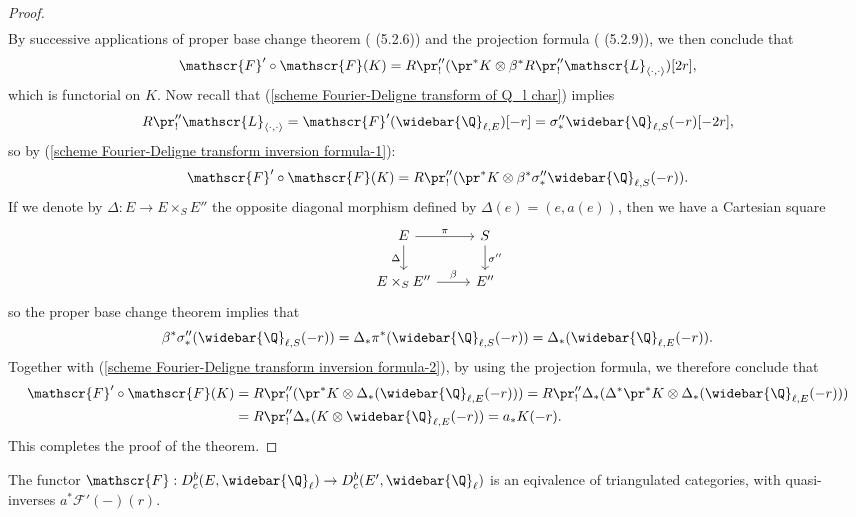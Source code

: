 \begin{proof}
\begin{align*}
\end{align*}
By successive applications of proper base change theorem (\cite{SGA4}  (5.2.6)) and the projection formula (\cite{SGA4}  (5.2.9)), we then conclude that
\begin{equation}\label{scheme Fourier-Deligne transform inversion formula-1}
\mathscr{F}'\circ\mathscr{F}(K)=R\pr''_!(\pr^*K\otimes\beta^*R\pr''_!\mathscr{L}_{\langle\cdot,\cdot\rangle})[2r],
\end{equation}
which is functorial on $K$. Now recall that (\ref{scheme Fourier-Deligne transform of Q_l char}) implies
\[R\pr''_!\mathscr{L}_{\langle\cdot,\cdot\rangle}=\mathscr{F}'(\widebar{\Q}_{\ell,E})[-r]=\sigma''_*\widebar{\Q}_{\ell,S}(-r)[-2r],\]
so by (\ref{scheme Fourier-Deligne transform inversion formula-1}):
\begin{equation}\label{scheme Fourier-Deligne transform inversion formula-2}
\mathscr{F}'\circ\mathscr{F}(K)=R\pr''_!(\pr^*K\otimes\beta^*\sigma''_*\widebar{\Q}_{\ell,S}(-r)).
\end{equation}
If we denote by $\Delta:E\to E\times_SE''$ the opposite diagonal morphism defined by $\Delta(e)=(e,a(e))$, then we have a Cartesian square
\[\begin{tikzcd}
E\ar[r,"\pi"]\ar[d,swap,"\Delta"]&S\ar[d,"\sigma''"]\\
E\times_SE''\ar[r,"\beta"]&E''
\end{tikzcd}\]
so the proper base change theorem implies that
\[\beta^*\sigma''_*(\widebar{\Q}_{\ell,S}(-r))=\Delta_*\pi^*(\widebar{\Q}_{\ell,S}(-r))=\Delta_*(\widebar{\Q}_{\ell,E}(-r)).\]
Together with (\ref{scheme Fourier-Deligne transform inversion formula-2}), by using the projection formula, we therefore conclude that
\begin{align*}
\mathscr{F}'\circ\mathscr{F}(K)&
=R\pr''_!(\pr^*K\otimes\Delta_*(\widebar{\Q}_{\ell,E}(-r)))
=R\pr''_!\Delta_*(\Delta^*\pr^*K\otimes\Delta_*(\widebar{\Q}_{\ell,E}(-r)))\\
&=R\pr''_!\Delta_*(K\otimes \widebar{\Q}_{\ell,E}(-r))=a_*K(-r).
\end{align*}
This completes the proof of the theorem.
\end{proof}

\begin{corollary}\label{scheme Fourier-Deligne transform quasi-inverse}
The functor $\mathscr{F}:D^b_c(E,\widebar{\Q}_\ell)\to D^b_c(E',\widebar{\Q}_\ell)$ is an eqivalence of triangulated categories, with quasi-inverses $a^*\mathscr{F}'(-)(r)$.
\end{corollary}


